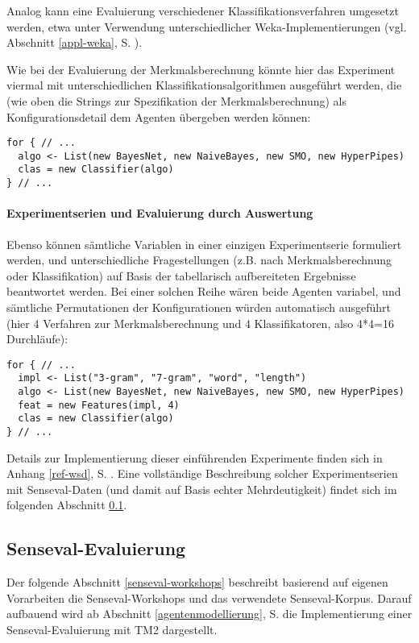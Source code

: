 \documentclass[abstracton, 12pt]{scrartcl}
\begin{document}
Analog kann eine Evaluierung verschiedener Klassifikationsverfahren umgesetzt werden, etwa unter Verwendung unterschiedlicher Weka-Implementierun\-gen (vgl. Abschnitt \ref{appl-weka}, S. \pageref{appl-weka}).

Wie bei der Evaluierung der Merkmalsberechnung könnte hier das Experiment viermal mit unterschiedlichen Klassifikationsalgorithmen ausgeführt werden, die (wie oben die Strings zur Spezifikation der Merkmalsberechnung) als Konfigurationsdetail dem Agenten übergeben werden können:

\begin{lstlisting}
for { // ...
  algo <- List(new BayesNet, new NaiveBayes, new SMO, new HyperPipes)
  clas = new Classifier(algo)
} // ...
\end{lstlisting}

\paragraph{Experimentserien und Evaluierung durch Auswertung}

Ebenso können sämtliche Variablen in einer einzigen Experimentserie formuliert werden, und unterschiedliche Fragestellungen (z.B. nach Merkmalsberechnung oder Klassifikation) auf Basis der tabellarisch aufbereiteten Ergebnisse beantwortet werden. Bei einer solchen Reihe wären beide Agenten variabel, und sämtliche Permutationen der Konfigurationen würden automatisch ausgeführt (hier 4 Verfahren zur Merkmalsberechnung und 4 Klassifikatoren, also 4*4=16 Durchläufe):

\begin{lstlisting}
for { // ...
  impl <- List("3-gram", "7-gram", "word", "length")
  algo <- List(new BayesNet, new NaiveBayes, new SMO, new HyperPipes)
  feat = new Features(impl, 4)
  clas = new Classifier(algo)
} // ...
\end{lstlisting}

Details zur Implementierung dieser einführenden Experimente finden sich in Anhang \ref{ref-wsd}, S. \pageref{ref-wsd}. Eine vollständige Beschreibung solcher Experimentserien mit Senseval-Daten (und damit auf Basis echter Mehrdeutigkeit) findet sich im folgenden Abschnitt \ref{appl-senseval}.

\subsection{Senseval-Evaluierung} \label{appl-senseval}

Der folgende Abschnitt \ref{senseval-workshops} beschreibt basierend auf eigenen Vorarbeiten \citep{Steeg2007} die Senseval-Workshops und das verwendete Senseval-Korpus. Darauf aufbauend wird ab Abschnitt \ref{agentenmodellierung}, S. \pageref{agentenmodellierung} die Implementierung einer Senseval-Evaluierung mit TM2 dargestellt.
\end{document}
